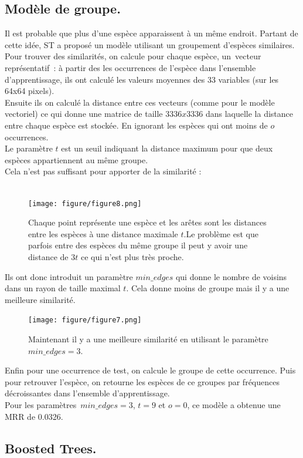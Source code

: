 \documentclass{article}
\begin{document}
\subsection{Modèle de groupe.}
Il est probable que plus d’une espèce apparaissent à un même endroit. Partant de cette idée, ST a proposé un modèle utilisant un groupement d’espèces similaires.\\Pour trouver des similarités, on calcule pour chaque espèce, un vecteur représentatif : à partir des les occurrences de l’espèce dans l’ensemble d’apprentissage, ils ont calculé les valeurs moyennes des 33 variables (sur les 64x64 pixels).\\
Ensuite ils on calculé la distance entre ces vecteurs (comme pour le modèle vectoriel) ce qui donne une matrice de taille $3336x3336$ dans laquelle la distance entre chaque espèce est stockée. En ignorant les espèces qui ont moins de $o$ occurrences.\\
Le paramètre $t$ est un seuil indiquant la distance maximum pour que deux espèces appartiennent au même groupe.\\
Cela n’est pas suffisant pour apporter de la similarité :\\\\
\begin{figure}[H]
	\center
	\texttt{[image: figure/figure8.png]} 
	 \caption{Chaque point représente une espèce et les arêtes sont les distances entre les espèces à une distance maximale $t$.Le problème est que parfois entre des espèces du même groupe il peut y avoir une distance de $3t$ ce qui n'est plus très proche. }
\end{figure}
Ils ont donc introduit un paramètre $min\_edges$ qui donne le nombre de voisins dans un rayon de taille maximal $t$. Cela donne moins de groupe mais il y a une meilleure similarité.\\
\begin{figure}[H]
	\center
	\texttt{[image: figure/figure7.png]} 
	 \caption{Maintenant il y a une meilleure similarité en utilisant le paramètre $min\_edges = 3 $. }
\end{figure}
Enfin pour une occurrence de test, on calcule le groupe de cette occurrence. Puis pour retrouver l’espèce, on retourne les espèces de ce groupes par fréquences décroissantes dans l’ensemble d’apprentissage.\\Pour les paramètres $min\_edges = 3$, $t = 9 $ et $o = 0$, ce modèle a obtenue une MRR de 0.0326.


\subsection{Boosted Trees.}
\end{document}

